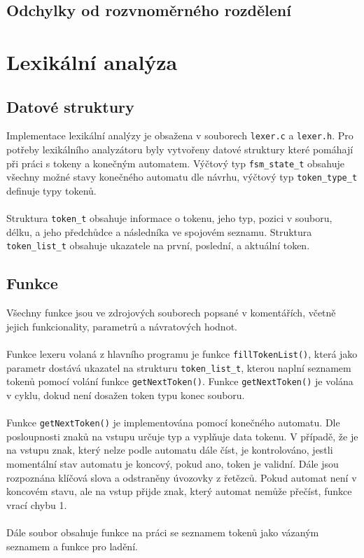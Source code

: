 \documentclass[11pt,a4paper]{article}
\begin{document}
    \subsection{Odchylky od rozvnoměrného rozdělení}
    

    \pagebreak{}

    \section{Lexikální analýza}

    \subsection{Datové struktury}
    Implementace lexikální analýzy je obsažena v souborech \verb|lexer.c| a \verb|lexer.h|.
    Pro potřeby lexikálního analyzátoru byly vytvořeny datové struktury které pomáhají při
    práci s tokeny a konečným automatem. Výčtový typ \verb|fsm_state_t| obsahuje všechny možné
    stavy konečného automatu dle návrhu, výčtový typ \verb|token_type_t| definuje typy tokenů.
    \\ \\
    Struktura \verb|token_t| obsahuje informace o tokenu, jeho typ, pozici v souboru, délku,
    a jeho předchůdce a následníka ve spojovém seznamu. Struktura \verb|token_list_t| obsahuje
    ukazatele na první, poslední, a aktuální token.

    \subsection{Funkce}

    Všechny funkce jsou ve zdrojových souborech popsané v komentářích, včetně jejich funkcionality, parametrů a návratových hodnot.
    \\ \\
    Funkce lexeru volaná z hlavního programu je funkce \verb|fillTokenList()|, která jako parametr
    dostává ukazatel na strukturu \verb|token_list_t|, kterou naplní seznamem tokenů pomocí volání
    funkce \verb|getNextToken()|. Funkce \verb|getNextToken()| je volána v cyklu, dokud není dosažen token
    typu konec souboru.
    \\ \\
    Funkce \verb|getNextToken()| je implementována pomocí konečného automatu. Dle posloupnosti znaků na vstupu
    určuje typ a vyplňuje data tokenu. V případě, že je na vstupu znak, který nelze podle automatu dále číst,
    je kontrolováno, jestli momentální stav automatu je koncový, pokud ano, token je validní.
    Dále jsou rozpoznána klíčová slova a odstraněny úvozovky z řetězců. Pokud automat není v koncovém stavu,
    ale na vstup přijde znak, který automat nemůže přečíst, funkce vrací chybu 1.
    \\ \\
    Dále soubor obsahuje funkce na práci se seznamem tokenů jako vázaným seznamem a funkce pro ladění.
\end{document}
